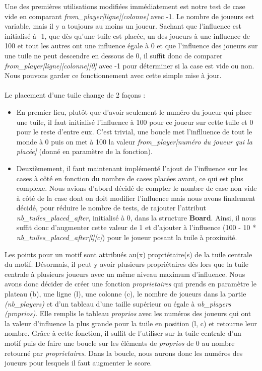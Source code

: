 \documentclass[a4paper]{article}
\begin{document}
Une des premières utilisations modifiées immédiatement est notre test de case vide en comparant \emph{from\_player[ligne][colonne]} avec -1. Le nombre de joueurs est variable, mais il y a toujours au moins un joueur. Sachant que l'influence est initialisé à -1, que dès qu'une tuile est placée, un des joueurs à une influence de 100 et tout les autres ont une influence égale à 0 et que l'influence des joueurs sur une tuile ne peut descendre en dessous de 0,  il suffit donc de comparer \emph{from\_player[ligne][colonne][0]} avec -1 pour déterminer si la case est vide ou non. Nous pouvons garder ce fonctionnement avec cette simple mise à jour.\\
\\
Le placement d'une tuile change de 2 façons : \\
\begin{itemize}
  \item En premier lieu, plutôt que d'avoir seulement le numéro du joueur qui place une tuile, il faut initialisé l'influence à 100 pour ce joueur sur cette tuile et 0 pour le reste d'entre eux. C'est trivial, une boucle met l'inflluence de tout le monde à 0 puis on met à 100 la valeur \emph{from\_player[numéro du joueur qui la placée]} (donné en paramètre de la fonction). \\
  \item Deuxièmement, il faut maintenant implémenté l'ajout de l'influence sur les cases à côté en fonction du nombre de cases placées avant, ce qui est plus complexe. Nous avions d'abord décidé de compter le nombre de case non vide à côté de la case dont on doit modifier l'influence mais nous avons finalement décidé, pour réduire le nombre de tests, de rajouter l'attribut \emph{nb\_tuiles\_placed\_after}, initialisé à 0, dans la structure \textbf{Board}. Ainsi, il nous suffit donc d'augmenter cette valeur de 1 et d'ajouter à l'influence (100 - 10 * \emph{nb\_tuiles\_placed\_after[l][c]}) pour le joueur posant la tuile à proximité. \\
\end{itemize}

Les points pour un motif sont attribués au(x) propriétaire(s) de la tuile centrale du motif. Désormais, il peut y avoir plusieurs propriétaires dès lors que la tuile centrale à plusieurs joueurs avec un même niveau maximum d'influence. Nous avons donc décider de créer une fonction \emph{proprietaires} qui prends en paramètre le plateau (b), une ligne (l), une colonne (c), le nombre de joueurs dans la partie \emph{(nb\_players)} et d'un tableau d'une taille supérieur ou égale à \emph{nb\_players} \emph{(proprios)}. Elle remplis le tableau \emph{proprios} avec les numéros des joueurs qui ont la valeur d'influence la plus grande pour la tuile en position (l, c) et retourne leur nombre. Grâce à cette fonction, il suffit de l'utiliser sur la tuile centrale d'un motif puis de faire une boucle sur les éléments de \emph{proprios} de 0 au nombre retourné par \emph{proprietaires}. Dans la boucle, nous aurons donc les numéros des joueurs pour lesquels il faut augmenter le score.\\
\end{document}
